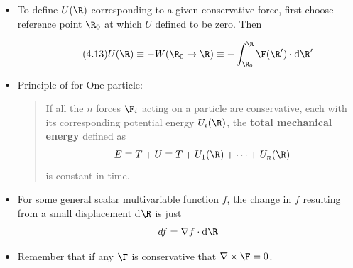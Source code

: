 \documentclass[10pt, twocolumn]{article}
\DeclareRobustCommand{\mybox}[2][gray!20]{%
	\begin{tcolorbox}[   %
		breakable,
		left=0pt,
		right=0pt,
		top=-13pt,
		bottom=0pt,
		colback=#1,
		colframe=#1,
		width=0.45\dimexpr\textwidth\relax,
		enlarge left by=0mm,
		boxsep=1pt,
		arc=0pt,outer arc=0pt,
		]
		#2
	\end{tcolorbox}
}
\begin{document}
\subsection{}
\begin{itemize}
	\item To define $U(\R)$ corresponding to a given conservative force, first choose reference point $\R_0$ at which $U$ defined to be zero. Then \mybox[gray!20]{
		\begin{align} \tag{4.13}
			U(\R) \equiv -W(\R_0 \rightarrow \R) \equiv -\int_{\R_0}^{\R} \F(\R') \cdot \mathrm{d}\R'
		\label{4.13}
		\end{align}}
	\item Principle of  for One particle:
	\begin{quote}
			If all the $n$ forces $\F_i$ acting on a particle are conservative, each with its corresponding potential energy $U_i(\R)$, the \textbf{total mechanical energy} defined as
			\begin{align}
				E \equiv T + U \equiv T + U_1(\R) + \cdots + U_n(\R)
			\end{align}
			is constant in time.
	\end{quote}
	\item For some general scalar multivariable function $f$, the change in $f$ resulting from a small displacement d$\R$ is just
	\begin{align}
		df = \nabla f \cdot \mathrm{d}\R
	\end{align}
	\item Remember that if any $\F$ is conservative that $\nabla \times \F = 0$. 
\end{itemize}
\end{document}
